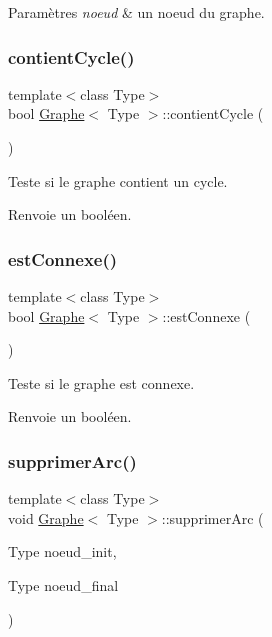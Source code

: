 \begin{DoxyParams}{Paramètres}
{\em noeud} & un noeud du graphe. \\
\hline
\end{DoxyParams}
\mbox{\label{classGraphe_aa003e00ed2d8c1d49c4b80e3dabfa4fd}} 
\subsubsection{\texorpdfstring{contient\+Cycle()}{contientCycle()}}
{\footnotesize\ttfamily template$<$class Type$>$ \\
bool \hyperlink{classGraphe}{Graphe}$<$ Type $>$\+::contient\+Cycle (\begin{DoxyParamCaption}{ }\end{DoxyParamCaption})}



Teste si le graphe contient un cycle. 

\begin{DoxyReturn}{Renvoie}
un booléen. 
\end{DoxyReturn}
\mbox{\label{classGraphe_a15609b3cd6e0ab6a96afb579ffd420c4}} 
\subsubsection{\texorpdfstring{est\+Connexe()}{estConnexe()}}
{\footnotesize\ttfamily template$<$class Type$>$ \\
bool \hyperlink{classGraphe}{Graphe}$<$ Type $>$\+::est\+Connexe (\begin{DoxyParamCaption}{ }\end{DoxyParamCaption})}



Teste si le graphe est connexe. 

\begin{DoxyReturn}{Renvoie}
un booléen. 
\end{DoxyReturn}
\mbox{\label{classGraphe_a4d2b2b022f6c4747f15e1f4e059fef33}} 
\subsubsection{\texorpdfstring{supprimer\+Arc()}{supprimerArc()}}
{\footnotesize\ttfamily template$<$class Type$>$ \\
void \hyperlink{classGraphe}{Graphe}$<$ Type $>$\+::supprimer\+Arc (\begin{DoxyParamCaption}\item[{Type}]{noeud\+\_\+init,  }\item[{Type}]{noeud\+\_\+final }\end{DoxyParamCaption})}



